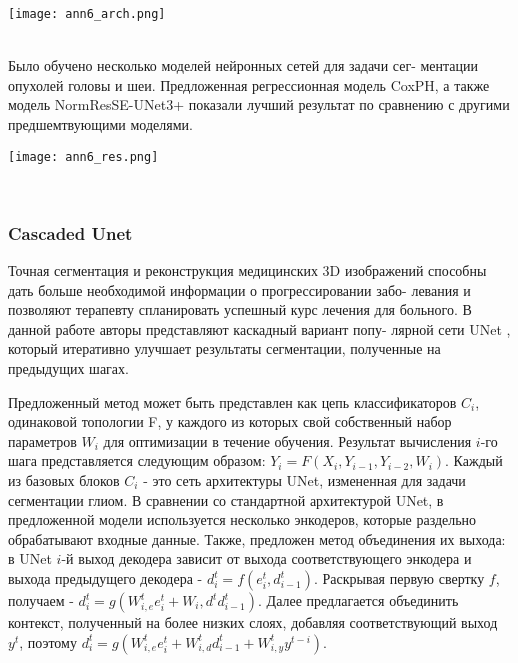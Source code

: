 \begin{minipage}{1.0\linewidth}
    \centering
    \texttt{[image: ann6\_arch.png]}
\end{minipage}
\\

Было обучено несколько моделей нейронных сетей для задачи сег-
ментации опухолей головы и шеи. Предложенная регрессионная
модель CoxPH, а также модель NormResSE-UNet3+ показали лучший результат по сравнению с другими предшемтвующими моделями.


\begin{minipage}{1.0\linewidth}
    \begin{center}
    \texttt{[image: ann6\_res.png]}\\
\end{center}
\end{minipage}
\\


\subsubsection*{Cascaded Unet}
Точная сегментация и реконструкция медицинских 3D изображений
способны дать больше необходимой информации о прогрессировании забо-
левания и позволяют терапевту спланировать успешный курс лечения для
больного. В данной работе \cite{Cascaded} авторы представляют каскадный вариант попу-
лярной сети UNet \cite{Unet}, который итеративно улучшает результаты сегментации,
полученные на предыдущих шагах.\par
Предложенный метод может быть представлен как цепь классификаторов 
\(C_i\), одинаковой топологии F, у каждого из которых свой собственный 
набор параметров \(W_i\) для оптимизации в течение обучения.
Результат вычисления \(i\)-го шага представляется следующим образом: 
\(Y_i=F(X_i,Y_{i-1}, Y_{i-2}, W_i)\). Каждый из базовых блоков \(C_i\) - это
сеть архитектуры UNet, измененная для задачи сегментации глиом. В сравнении 
со стандартной архитектурой UNet, в предложенной модели используется несколько 
энкодеров, которые раздельно обрабатывают входные данные. Также, предложен метод объединения 
их выхода: в UNet \(i\)-й выход декодера зависит от выхода соответствующего 
энкодера и выхода предыдущего декодера - \(d_i^{t}=f(e_i^{t}, d^{t}_{i-1})\). 
Раскрывая первую свертку \(f\), получаем - \(d_i^{t}=g(W_{i,e}^{t}e_i^{t}+W_{i},d^{t}d^{t}_{i-1})\).
Далее предлагается объединить контекст, полученный на более низких слоях, 
добавляя соответствующий выход \(y^t\), поэтому \(d_i^{t}=g(W_{i,e}^{t}e_i^{t}+W_{i,d}^{t}d^{t}_{i-1}+W_{i,y}^{t}y^{t-i})\).
\par 

